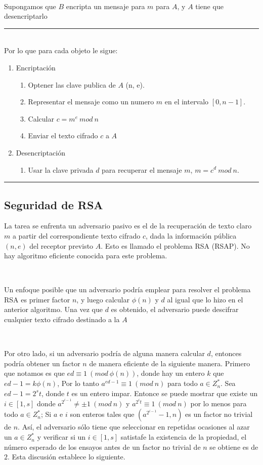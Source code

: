 \documentclass[11pt, conference]{IEEEtran}
\begin{document}
\

Supongamos que $B$ encripta un mensaje para $m$ para $A$, y $A$ tiene que desencriptarlo\\
\rule[0mm]{181mm}{0.1mm}\\
Por lo que para cada objeto le sigue:
\begin{enumerate}
	\item Encriptación
	\begin{enumerate}
		\item Optener las clave publica de $A$ (n, e).
		\item Representar el mensaje como un numero $m$ en el intervalo $[0, n-1]$.
		\item Calcular $c = m^e\ mod\ n$
		\item Enviar el texto cifrado $c$ a $A$
	\end{enumerate}
	\item Desencriptación 
	\begin{enumerate}
		\item Usar la clave privada $d$ para recuperar el mensaje $m$, $m = c^d\ mod\ n$.
	\end{enumerate}
\end{enumerate}
\rule[3mm]{181mm}{0.1mm}

\subsection[Seguridad de RSA]{\textbf{Seguridad de RSA}}
La tarea se enfrenta un adversario pasivo es el de la recuperación de texto claro $m$ a partir del correspondiente texto cifrado $c$, dada la información pública $(n, e)$ del receptor previsto $A$. Esto es llamado el problema RSA (RSAP). No hay algoritmo eficiente conocida para este problema.

\

Un enfoque posible que un adversario podría emplear para resolver el problema RSA es primer factor $n$, y luego calcular $\phi(n)$ y $d$ al igual que lo hizo en el anterior algoritmo. Una vez que $d$ es obtenido, el adversario puede descifrar cualquier texto cifrado destinado a la $A$

\


Por otro lado, si un adversario podría de alguna manera calcular $d$, entonces podría obtener un factor $n$ de manera eficiente de la siguiente manera. Primero que notamos es que $ed\equiv1\ (mod\ \phi(n))$, donde hay un entero $k$ que $ed-1=k\phi(n)$, Por lo tanto $a^{ed-1}\equiv1\ (mod\ n)$ para todo $a\in Z^*_n$. Sea $ed-1 = 2^st$, donde $t$ es un entero impar. Entonce se puede mostrar que existe un $i \in [1,s]$ donde $a^{2^{i-1}}\neq\pm 1\ (mod\ n)$ y $a^{2^it}\equiv1\ (mod\ n)$ por lo menos para todo $a\in Z_n^*$; Si $a$ e $i$ son enteros tales que $(a^{2^{i-1}}-1,n)$ es un factor no trivial de $n$. Así, el adversario sólo tiene que seleccionar en repetidas ocasiones al azar un $a\in Z^*_n$ y verificar si un $i\in[1,s]$ satistafe la existencia de la propiedad,  el número esperado de los ensayos antes de un factor no trivial de $n$ se obtiene es de $2$. Esta discusión establece lo siguiente.
\end{document}
